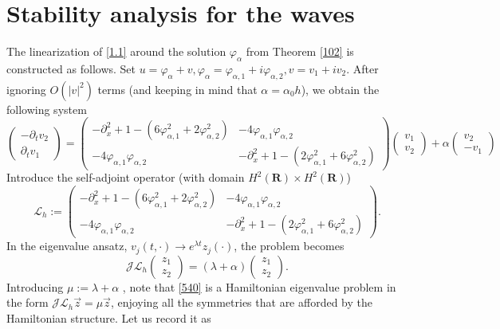 \documentclass[12pt]{amsart}
\theoremstyle{definition}
\theoremstyle{remark}
\numberwithin{equation}{section}
\renewcommand{\(}{\left(}
\renewcommand{\)}{\right)}
\renewcommand{\[}{\left[}
\renewcommand{\]}{\right]}
\newcommand{\cl}{{\mathcal L}}
\newcommand{\al}{\alpha}
\newcommand{\la}{\lambda}
\newcommand{\vp}{\varphi}
\newcommand{\rone}{\mathbf R}
\newcommand{\p}{\partial}
\newcommand{\cj}{{\mathcal J}}
\begin{document}
 \section{Stability analysis for the waves}
  The linearization of \eqref{1.1} around the solution $\vp_\al$ from Theorem \ref{102} is constructed as follows.  Set $u=\vp_\al+v, \vp_\al=\vp_{\al,1}+i \vp_{\al,2}, v=v_1+i v_2$. After ignoring $O(|v|^2)$ terms (and keeping in mind that $\al=\al_0 h$), we obtain the following system
  $$
  \left(\begin{array}{c}
 -\p_t v_2 \\ \p_t v_1
 \end{array}
  \right)=\left(\begin{array}{cc}
 -\p_x^2+1-(6\vp_{\al,1}^2+2\vp_{\al,2}^2) & -4 \vp_{\al,1} \vp_{\al,2}    \\
 -4 \vp_{\al,1} \vp_{\al,2}  &  -\p_x^2+1-(2\vp_{\al,1}^2 + 6\vp_{\al,2}^2)
  \end{array}
  \right)\left(\begin{array}{c}
  v_1 \\ v_2
  \end{array}
  \right)+\al  \left(\begin{array}{c}
    v_2 \\ -v_1
  \end{array}
  \right)
  $$
  Introduce the self-adjoint operator (with domain $H^2(\rone)\times H^2(\rone)$)
  $$
  \cl_h:=\left(\begin{array}{cc}
  -\p_x^2+1-(6\vp_{\al,1}^2+2\vp_{\al,2}^2) & -4 \vp_{\al,1} \vp_{\al,2}    \\
  -4 \vp_{\al,1} \vp_{\al,2}  &  -\p_x^2+1-(2\vp_{\al,1}^2 + 6\vp_{\al,2}^2)
  \end{array}
  \right).
  $$
  In the eigenvalue ansatz, $v_j(t,\cdot)\to e^{\la t} z_j(\cdot)$, the problem becomes
  \begin{equation}
  \label{540}
 \cj \cl_h
 \left(\begin{array}{c}
   z_1 \\ z_2
   \end{array}
   \right) =  (\la+\al)  \left(\begin{array}{c}
   z_1 \\ z_2
   \end{array}
   \right).
  \end{equation}
Introducing $\mu:=\la+\al$ ,  note that \eqref{540} is a Hamiltonian eigenvalue problem in the form $\cj \cl_h \vec{z}=\mu \vec{z}$,
 enjoying all the symmetries that are afforded by the Hamiltonian structure. Let us record it as
\end{document}
